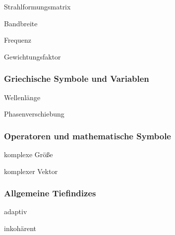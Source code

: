 \begin{description}[leftmargin=\widthof{\textbf{XXXXXXX}\hspace{\labelsep}},style=nextline]
	\item[$\mathbf{B}$] Strahlformungsmatrix
	\item[$B$] Bandbreite
	\item[$f$] Frequenz
	\item[$g$] Gewichtungsfaktor
\end{description}




\subsubsection*{Griechische Symbole und Variablen}
\begin{description}[leftmargin=\widthof{\textbf{XXXXXXX}\hspace{\labelsep}},style=nextline]
	\item[$\lambda$] Wellenl\"ange
	\item[$\varphi$] Phasenverschiebung
\end{description}

\subsubsection*{Operatoren und mathematische Symbole}
\begin{description}[leftmargin=\widthof{\textbf{XXXXXXX}\hspace{\labelsep}},style=nextline]
	\item[$a$] komplexe Gr\"o{\ss}e
	\item[$\vec a$] komplexer Vektor
\end{description}


\subsubsection*{Allgemeine Tiefindizes}
\begin{description}[leftmargin=\widthof{\textbf{XXXXXXX}\hspace{\labelsep}},style=nextline]
	\item[$\mathrm{adapt}$] adaptiv
	\item[$\mathrm{incoh}$] inkohärent
\end{description}
